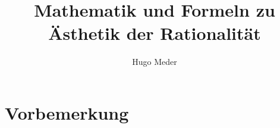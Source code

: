 

\title{Mathematik und Formeln zu Ästhetik der Rationalität}
\author{Hugo Meder}


\maketitle
\chapter*{Vorbemerkung}


\tableofcontents

\def\makebook{1}









